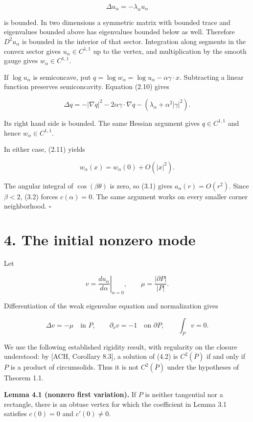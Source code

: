 \documentclass[11pt]{article}
\begin{document}
\[
\Delta u_\alpha=-\lambda_\alpha u_\alpha
\tag{3.9}
\]

is bounded. In two dimensions a symmetric matrix with bounded trace and
eigenvalues bounded above has eigenvalues bounded below as well.
Therefore \(D^2u_\alpha\) is bounded in the interior of that sector.
Integration along segments in the convex sector gives
\(u_\alpha\in C^{1,1}\) up to the vertex, and multiplication by the
smooth gauge gives \(w_\alpha\in C^{1,1}\).

If \(\log u_\alpha\) is semiconcave, put
\(q=\log w_\alpha=\log u_\alpha-\alpha\gamma\cdot x\). Subtracting a
linear function preserves semiconcavity. Equation (2.10) gives

\[
\Delta q=-|\nabla q|^2-2\alpha\gamma\cdot\nabla q
-(\lambda_\alpha+\alpha^2|\gamma|^2).
\tag{3.10}
\]

Its right hand side is bounded. The same Hessian argument gives
\(q\in C^{1,1}\) and hence \(w_\alpha\in C^{1,1}\).

In either case, (2.11) yields

\[
w_\alpha(x)=w_\alpha(0)+O(|x|^2).
\tag{3.11}
\]

The angular integral of \(\cos(\beta\theta)\) is zero, so (3.1) gives
\(a_\alpha(r)=O(r^2)\). Since \(\beta<2\), (3.2) forces \(c(\alpha)=0\).
The same argument works on every smaller corner neighborhood. \(\square\)

\section{4. The initial nonzero mode}\label{the-initial-nonzero-mode}

Let

\[
v=\left.\frac{d u_\alpha}{d\alpha}\right|_{\alpha=0},
\qquad \mu=\frac{|\partial P|}{|P|}.
\tag{4.1}
\]

Differentiation of the weak eigenvalue equation and normalization gives

\[
\Delta v=-\mu\quad\text{in }P,
\qquad \partial_\nu v=-1\quad\text{on }\partial P,
\qquad \int_Pv=0.
\tag{4.2}
\]

We use the following established rigidity result, with regularity on the
closure understood: by {[}ACH, Corollary 8.3{]}, a solution of (4.2) is
\(C^2(\overline P)\) if and only if \(P\) is a product of circumsolids.
Thus it is not \(C^2(\overline P)\) under the hypotheses of Theorem 1.1.

\textbf{Lemma 4.1 (nonzero first variation).} If \(P\) is neither
tangential nor a rectangle, there is an obtuse vertex for which the
coefficient in Lemma 3.1 satisfies \(c(0)=0\) and \(c'(0)\ne0\).
\end{document}
